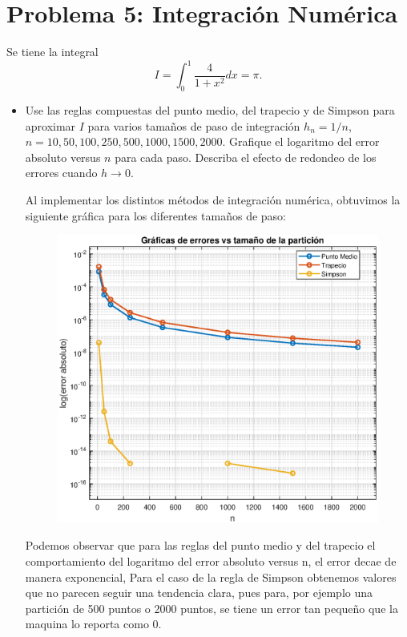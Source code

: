 
\section{Problema 5: Integración Numérica}
Se tiene la integral
\[
I = \int_0^1 \frac{4}{1 + x^2} dx = \pi.
\]

\begin{itemize}
    \item Use las reglas compuestas del punto medio, del trapecio y de Simpson para aproximar $I$ para varios tamaños de paso de integración $h_n = 1/n$, $n = 10, 50, 100, 250, 500, 1000, 1500, 2000$. Grafique el logaritmo del error absoluto versus $n$ para cada paso. Describa el efecto de redondeo de los errores cuando $h \to 0$.
    \begin{solution}
        Al implementar los distintos métodos de integración numérica, obtuvimos la siguiente gráfica para los diferentes tamaños de paso:

        \begin{figure}[H]
         \centering
         \includegraphics[scale=0.7]{Graficas/Punto_5_a.eps}
         \end{figure}  

         Podemos observar que para las reglas del punto medio y del trapecio el comportamiento del logaritmo del error absoluto versus n, el error decae de manera exponencial, Para el caso de la regla de Simpson obtenemos valores que no parecen seguir una tendencia clara, pues para, por ejemplo una partición de 500 puntos o 2000 puntos, se tiene un error tan pequeño que la maquina lo reporta como 0.


\end{solution}
\end{itemize}
